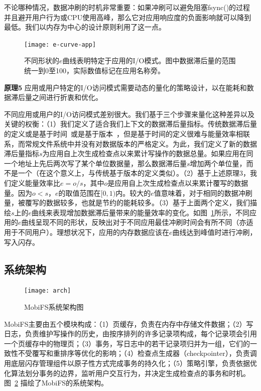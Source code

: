 不论哪种情况，数据冲刷的时机非常重要：如果冲刷可以避免阻塞fsync()的过程并且避开用户行为或CPU使用高峰，那么它对应用响应度的负面影响就可以降到最低。我们以内存为中心的设计原则利用了这一点。

\begin{figure}
  \centering
  \texttt{[image: e-curve-app]}
  \caption{不同形状的$e$曲线表明特定于应用的I/O模式。图中数据滞后量的范围统一到0至100，实际数值标记在应用名称旁。}
  \label{fig:e-curve-app}
\end{figure}

\textbf{原理5} 应用或用户特定的I/O访问模式需要动态的量化的策略设计，以在能耗和数据滞后量之间进行折衷和优化。

不同应用或用户的I/O访问模式差别很大。我们基于三个步骤来量化这种差异以及关键的权衡：（1）我们定义了适合我们上下文的数据滞后量指标。传统数据滞后量的定义或是基于时间~\cite{Ports:2010:TCA:1924943.1924963}或是基于版本~\cite{Bailis:2012:PBS:2212351.2212359}，但是基于时间的定义很难与能量效率相联系，而常规文件系统中并没有对数据版本的严格定义。为此，我们定义了新的数据滞后量指标$s$为应用自上次生成检查点以来累计写操作的数据总量。如果应用在同一个地址上先后两次写了某个单位数据量，那么数据滞后量$s$增加两个单位量，而不是一个（在这个意义上，与传统基于版本的定义类似）。（2）基于上述原理3，我们定义能量效率比$e=o/s$，其中$o$是应用自上次生成检查点以来累计覆写的数据量。因为$o<s$，$e$的取值范围在$[0,1)$内。较大的$e$值意味着，对于相同的数据冲刷量，被覆写的数据较多，也就是节约的能耗较多。（3）基于上面两个定义，我们描绘$s$上的$e$曲线来表现增加数据滞后量带来的能量效率的变化。如图~\ref{fig:e-curve-app}所示，不同应用的$e$曲线呈现不同的形状，反映出对于不同应用最佳冲刷时间会有所不同（亦适用于不同用户）。理想状况下，应用的内存数据应该在$e$曲线达到峰值时进行冲刷，写入闪存。

\subsection{系统架构}

\begin{figure}
  \centering
  \texttt{[image: arch]}
  \caption{MobiFS系统架构图}
  \label{fig:arch}
\end{figure}

MobiFS主要由五个模块构成：（1）页缓存，负责在内存中存储文件数据；（2）写日志，负责维护写操作的历史，由按序排列的许多记录项构成，每个记录项会引用一个页缓存中的物理页；（3）事务，写日志中的若干记录项归并为一组，它们的一致性不受覆写和重排序等优化的影响；（4）检查点生成器（checkpointer），负责调用底层闪存管理组件以原子性方式完成事务的持久化；（5）策略引擎，负责依据优化算法划分事务的边界，监听用户交互行为，并决定生成检查点的事务和时机。图~\ref{fig:arch} 描绘了MobiFS的系统架构。

